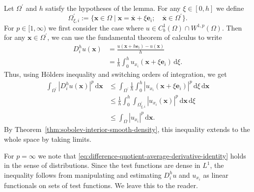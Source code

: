 \begin{Proof}
Let $\Omega^{\prime}$ and $h$ satisfy the hypotheses of the lemma. For any $\xi\in[0,h]$ we define
\begin{equation}\label{eq:difference-quotient-translated-interior-domain}
\Omega_{\xi,i}^{\prime}:=\{\bm{x}\in\Omega\mid\bm{x}=\overline{\bm{x}}+\xi\bm{e}_i;\quad\overline{\bm{x}}\in\Omega^{\prime}\}.
\end{equation}
For $p\in[1,\infty)$ we first consider the case where $u\in C_b^1(\Omega)\cap W^{1,p}(\Omega)$. Then for any $\bm{x}\in\Omega^{\prime}$, we can use the fundamental theorem of calculus to write
\begin{equation}\label{eq:difference-quotient-average-derivative-identity}
\begin{aligned}
D_i^hu(\bm{x})&=\frac{u(\bm{x}+h\bm{e}_i)-u(\bm{x})}{h}\\
&=\frac{1}{h}\int_0^hu_{x_i}(\bm{x}+\xi\bm{e}_i)\,\mathrm{d}\xi.
\end{aligned}
\end{equation}
Thus, using Hölder\textquotesingle s inequality and switching orders of integration, we get\[\begin{aligned}
\int_{\Omega^{\prime}}|D_i^hu(\bm{x})|^p\,\mathrm{d}\bm{x}
&\leq\int_{\Omega^{\prime}}\frac{1}{h}\int_0^h|u_{x_i}(\bm{x}+\xi\bm{e}_i)|^p\,\mathrm{d}\xi\,\mathrm{d}\bm{x}\\
&\leq\frac{1}{h}\int_0^h\int_{\Omega_{\xi,i}^{\prime}}|u_{x_i}(\bm{x})|^p\,\mathrm{d}\bm{x}\,\mathrm{d}\xi\\
&\leq\int_\Omega|u_{x_i}|^p\,\mathrm{d}\bm{x}.
\end{aligned}\]By Theorem~\ref{thm:sobolev-interior-smooth-density}, this inequality extends to the whole space by taking limits.

For $p=\infty$ we note that \eqref{eq:difference-quotient-average-derivative-identity} holds in the sense of distributions. Since the test functions are dense in $L^1$, the inequality follows from manipulating and estimating $D_i^hu$ and $u_{x_i}$ as linear functionals on sets of test functions. We leave this to the reader.
\end{Proof}
